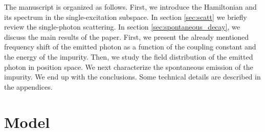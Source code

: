 \documentclass[aps,pra,twocolumn,floatfix,superscriptaddress]{revtex4-1}%
\begin{document}

The manuscript is organized as follows. First, we introduce the Hamiltonian and its spectrum in the single-excitation subspace.  In section \ref{sec:scatt} we briefly review the single-photon scattering. In section \ref{sec:spontaneous_decay}, we discuss the main results of the paper. First, we present the already mentioned frequency shift of the emitted photon as a function of the coupling constant and the energy of the impurity. Then, we study the field distribution of the emitted photon in position space. We next characterize the spontaneous emission of the impurity.
We end up with the conclusions. Some technical details are described in the appendices.


\section{Model}
\end{document}

